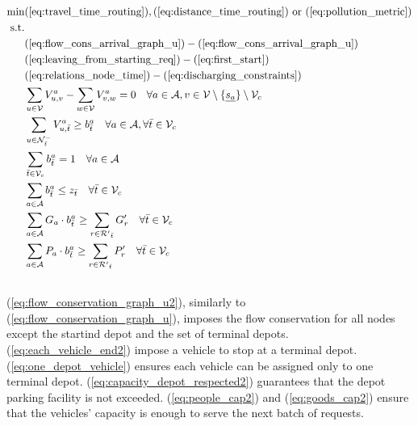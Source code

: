 \begin{align}
	\text{min}&  
		(\ref{eq:travel_time_routing}), (\ref{eq:distance_time_routing}) \text{ or } (\ref{eq:pollution_metric})
	\nonumber\\
	\text{s.t.} &\nonumber\\
	&(\ref{eq:flow_cons_arrival_graph_u})-(\ref{eq:flow_cons_arrival_graph_u})\nonumber\\
	&(\ref{eq:leaving_from_starting_req})-(\ref{eq:first_start})	\nonumber\\
	&(\ref{eq:relations_node_time})-(\ref{eq:discharging_constraints})\nonumber\\
	&\sum_{u \in \mathcal{V}} V^a_{u, v} - \sum_{w \in \mathcal{V}} V^a_{v, w} = 0 \quad \forall a \in \mathcal{A}, v \in \mathcal{V} \setminus \{\underline{s_a}\}\setminus\mathcal{V}_c  \label{eq:flow_conservation_graph_u2} \\	
	&\sum_{ u \in \mathcal{N}^-_{\bar{t}} }V^a_{u, \bar{t}} \ge b_{\bar{t}}^a \quad \forall a \in \mathcal{A},\forall \bar{t} \in \mathcal{V}_c  \label{eq:each_vehicle_end2}\\
	 &\sum_{\bar{t}\in \mathcal{V}_c} b_{\bar{t}}^a = 1\quad \forall a \in \mathcal{A}
	 \label{eq:one_depot_vehicle}\\
	&\sum_{a \in \mathcal{A}}b_{\bar{t}}^a  \leq z_{\bar{t}} \quad \forall \bar{t} \in \mathcal{V}_c \label{eq:capacity_depot_respected2}\\
	&\sum_{a \in \mathcal{A}} G_a \cdot b_{\bar{t}}^a \ge \sum_{r \in \mathcal{R'}_{\bar{t}}} G'_r \quad \forall \bar{t} \in \mathcal{V}_c \label{eq:goods_cap2}\\
	&\sum_{a \in \mathcal{A}}P_a \cdot b_{\bar{t}}^a\ge \sum_{r \in \mathcal{R'}_{\bar{t}}} P'_r \quad \forall \bar{t} \in \mathcal{V}_c \label{eq:people_cap2}\\
	\nonumber
\end{align}
(\ref{eq:flow_conservation_graph_u2}), similarly to (\ref{eq:flow_conservation_graph_u}), imposes the flow conservation for all nodes except the startind depot and the set of terminal depots. (\ref{eq:each_vehicle_end2}) impose a vehicle to stop at a terminal depot.  (\ref{eq:one_depot_vehicle}) ensures each vehicle can be assigned only to one terminal depot. (\ref{eq:capacity_depot_respected2}) guarantees that the depot parking facility is not exceeded. (\ref{eq:people_cap2}) and (\ref{eq:goods_cap2}) ensure that the vehicles' capacity is enough to serve the next batch of requests. \\
